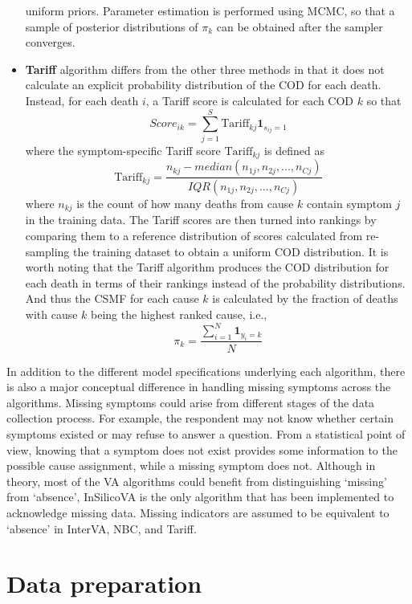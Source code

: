 \begin{itemize}
  uniform priors. Parameter estimation is performed using MCMC, so that
  a sample of posterior distributions of \(\pi_k\) can be obtained after
  the sampler converges.
\item
  \textbf{Tariff} algorithm \citep{james} differs from the other three
  methods in that it does not calculate an explicit probability
  distribution of the COD for each death. Instead, for each death \(i\),
  a Tariff score is calculated for each COD \(k\) so that \[
  Score_{ik} = \sum_{j = 1}^{S} \mbox{Tariff}_{kj}\mathbf{1}_{s_{ij}=1}
  \] where the symptom-specific Tariff score \(\mbox{Tariff}_{kj}\) is
  defined as \[
  \mbox{Tariff}_{kj} = \frac{n_{kj} - median(n_{1j}, n_{2j}, ..., n_{Cj})} {IQR(n_{1j}, n_{2j}, ..., n_{Cj})}
  \] where \(n_{kj}\) is the count of how many deaths from cause \(k\)
  contain symptom \(j\) in the training data. The Tariff scores are then
  turned into rankings by comparing them to a reference distribution of
  scores calculated from re-sampling the training dataset to obtain a
  uniform COD distribution. It is worth noting that the Tariff algorithm
  produces the COD distribution for each death in terms of their
  rankings instead of the probability distributions. And thus the CSMF
  for each cause \(k\) is calculated by the fraction of deaths with
  cause \(k\) being the highest ranked cause, i.e., \[
  \pi_k = \frac{\sum_{i=1}^N\mathbf{1}_{y_i = k}}{N}
  \]
\end{itemize}

In addition to the different model specifications underlying each
algorithm, there is also a major conceptual difference in handling
missing symptoms across the algorithms. Missing symptoms could arise
from different stages of the data collection process. For example, the
respondent may not know whether certain symptoms existed or may refuse
to answer a question. From a statistical point of view, knowing that a
symptom does not exist provides some information to the possible cause
assignment, while a missing symptom does not. Although in theory, most
of the VA algorithms could benefit from distinguishing `missing' from
`absence', InSilicoVA is the only algorithm that has been implemented to
acknowledge missing data. Missing indicators are assumed to be
equivalent to `absence' in InterVA, NBC, and Tariff.

\hypertarget{data-preparation}{%
\section{Data preparation}\label{data-preparation}}

